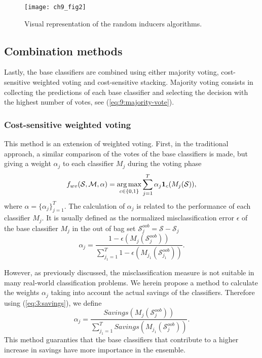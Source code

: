 {\begin{figure}[t!]
\texttt{[image: ch9\_fig2]}
\caption{Visual representation of the random inducers algorithms.}
\label{fig:9:2}
\end{figure} 


\subsection{Combination methods}

Lastly, the base classifiers are combined using either majority voting, cost-sensitive weighted 
voting and cost-sensitive stacking. Majority voting consists in collecting the predictions of 
each base classifier and selecting the decision with the highest number of votes, see 
(\ref{eq:9:majority-vote}).

\subsubsection{Cost-sensitive weighted voting}

This method is an extension of weighted voting. First, in the traditional approach, a 
similar comparison of the votes of the base classifiers is made, but giving a weight $\alpha_j$ 
to each classifier $M_j$ during the voting phase \citep{Zhou2012}
\begin{align} \label{eq:9:weighted-majority-vote}
  f_{wv}(\mathcal{S},\mathcal{M}, \alpha)
  =\operatorname*{arg\,max}_{c \in \{0,1\}} \sum_{j=1}^T \alpha_j \mathbf{1}_c(M_j(\mathcal{S})),
\end{align}
where $\alpha=\{\alpha_j\}_{j=1}^T$.
The calculation of $\alpha_j$ is related to the performance of each classifier $M_j$.
It is usually defined as the normalized misclassification error   $\epsilon$ of the base 
classifier $M_j$  in the out of bag set   $\mathcal{S}_j^{oob}=\mathcal{S}-\mathcal{S}_j$
\begin{equation}
  \alpha_j=\frac{1-\epsilon(M_j(\mathcal{S}_j^{oob}))}{\sum_{j_1=1}^T 
  1-\epsilon(M_{j_1}(\mathcal{S}_{j_1}^{oob}))}.
\end{equation}

\noindent However, as previously discussed, the misclassification measure is not suitable in  many 
real-world classification problems. We  herein propose a method to calculate the weights $\alpha_j$ 
 taking into account the actual savings of the classifiers. Therefore using (\ref{eq:3:savings}), we 
define
\begin{equation}
  \alpha_j=\frac{Savings(M_j(\mathcal{S}_j^{oob}))}
  {\sum_{j_1=1}^T Savings(M_{j_1}(\mathcal{S}_j^{oob}))}.
\end{equation}
This method guaranties that the base classifiers that contribute to a higher increase in savings 
have more importance in the ensemble.

}
